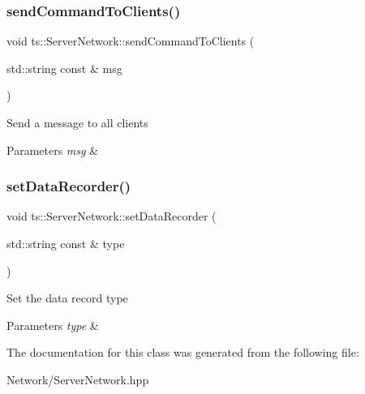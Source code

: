 \subsubsection{\texorpdfstring{send\+Command\+To\+Clients()}{sendCommandToClients()}}
{\footnotesize\ttfamily void ts\+::\+Server\+Network\+::send\+Command\+To\+Clients (\begin{DoxyParamCaption}\item[{std\+::string const \&}]{msg }\end{DoxyParamCaption})}

Send a message to all clients 
\begin{DoxyParams}{Parameters}
{\em msg} & \\
\hline
\end{DoxyParams}
\mbox{\label{classts_1_1_server_network_aa615cf28d248391c13d2f1dfb97b8d1e}} 
\subsubsection{\texorpdfstring{set\+Data\+Recorder()}{setDataRecorder()}}
{\footnotesize\ttfamily void ts\+::\+Server\+Network\+::set\+Data\+Recorder (\begin{DoxyParamCaption}\item[{std\+::string const \&}]{type }\end{DoxyParamCaption})}

Set the data record type 
\begin{DoxyParams}{Parameters}
{\em type} & \\
\hline
\end{DoxyParams}


The documentation for this class was generated from the following file\+:\begin{DoxyCompactItemize}
\item 
Network/Server\+Network.\+hpp\end{DoxyCompactItemize}
